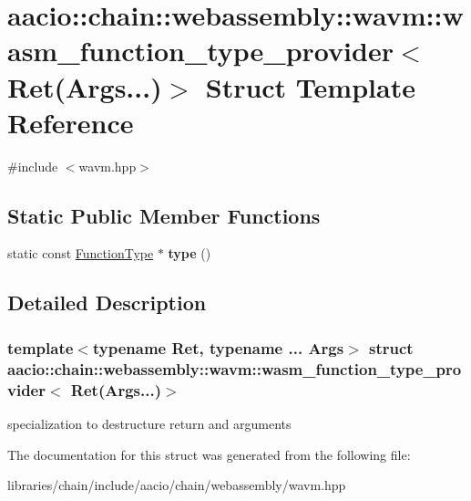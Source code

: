 \hypertarget{structaacio_1_1chain_1_1webassembly_1_1wavm_1_1wasm__function__type__provider_3_01_ret_07_args_8_8_8_08_4}{}\section{aacio\+:\+:chain\+:\+:webassembly\+:\+:wavm\+:\+:wasm\+\_\+function\+\_\+type\+\_\+provider$<$ Ret(Args...)$>$ Struct Template Reference}
\label{structaacio_1_1chain_1_1webassembly_1_1wavm_1_1wasm__function__type__provider_3_01_ret_07_args_8_8_8_08_4}


{\ttfamily \#include $<$wavm.\+hpp$>$}

\subsection*{Static Public Member Functions}
\begin{DoxyCompactItemize}
\item 
\mbox{\label{structaacio_1_1chain_1_1webassembly_1_1wavm_1_1wasm__function__type__provider_3_01_ret_07_args_8_8_8_08_4_a2d00691630fd946e88d23c05cd29d669}} 
static const \mbox{\hyperlink{struct_i_r_1_1_function_type}{Function\+Type}} $\ast$ {\bfseries type} ()
\end{DoxyCompactItemize}


\subsection{Detailed Description}
\subsubsection*{template$<$typename Ret, typename ... Args$>$\newline
struct aacio\+::chain\+::webassembly\+::wavm\+::wasm\+\_\+function\+\_\+type\+\_\+provider$<$ Ret(\+Args...)$>$}

specialization to destructure return and arguments 

The documentation for this struct was generated from the following file\+:\begin{DoxyCompactItemize}
\item 
libraries/chain/include/aacio/chain/webassembly/wavm.\+hpp\end{DoxyCompactItemize}

